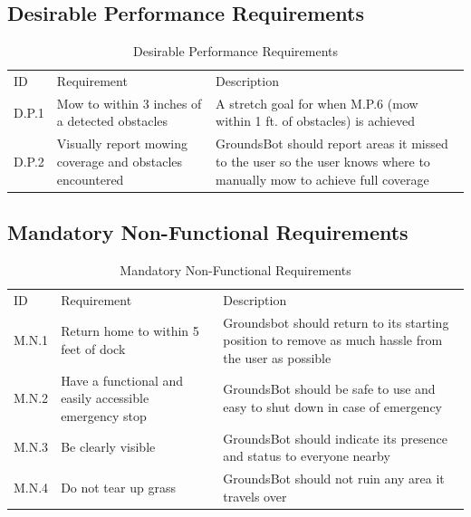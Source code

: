 \documentclass[12pt]{extarticle}
\begin{document}
\subsection{Desirable Performance Requirements}
\begin{center}
  \begin{table}[H]
  \caption{Desirable Performance Requirements}
  \label{table: desirable performance}
  

  \def\arraystretch{1.5}
  \begin{tabularx}{\textwidth}{ lXX }
      \hline
	  \sffamily\normalsize{ID} & \sffamily\normalsize{Requirement} & \sffamily\normalsize{Description} \\
	  D.P.1 &
	  Mow to within 3 inches of a detected obstacles &
	  A stretch goal for when M.P.6 (mow within 1 ft. of obstacles) is achieved \\
  	  D.P.2 &
  	  Visually report mowing coverage and obstacles encountered &
  	  GroundsBot should report areas it missed to the user so the user knows where to manually mow to achieve full coverage\\
  \end{tabularx}
  \end{table}
\end{center}

\subsection{Mandatory Non-Functional Requirements}
\begin{center}
  \begin{table}[H]
   \caption{Mandatory Non-Functional Requirements}
    \label{table: mandatory non-functional}
    

    \def\arraystretch{1.5}
    \begin{tabularx}{\textwidth}{ lXX }
     \hline
  	 \sffamily\normalsize{ID} & \sffamily\normalsize{Requirement} & \sffamily\normalsize{Description} \\
	  M.N.1 &
  	  Return home to within 5 feet of dock &
  	  Groundsbot should return to its starting position to remove as much hassle from the user as possible \\  	  
  	  M.N.2 &
  	  Have a functional and easily accessible emergency stop &
  	  GroundsBot should be safe to use and easy to shut down in case of emergency\\
  	  M.N.3 &
  	  Be clearly visible &
  	  GroundsBot should indicate its presence and status to everyone nearby \\
  	  M.N.4 &
  	  Do not tear up grass &
  	  GroundsBot should not ruin any area it travels over \\
  	\end{tabularx}
  \end{table}
\end{center}
\end{document}
